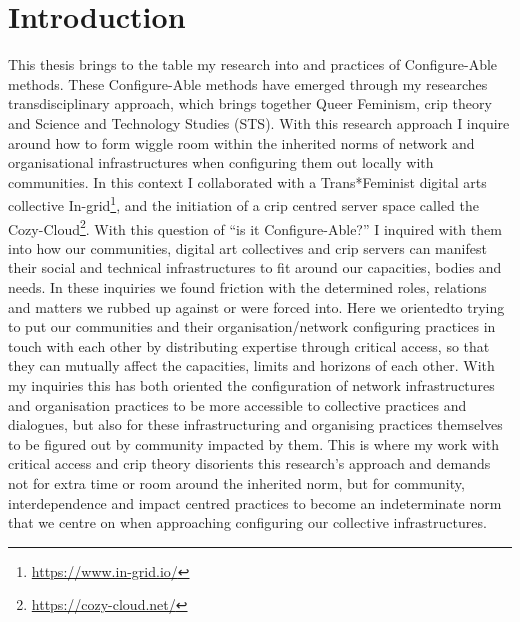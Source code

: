 \hypertarget{introduction}{%
\section{Introduction}\label{introduction}}

This thesis brings to the table my research into and practices of
Configure-Able methods. These Configure-Able methods have emerged
through my researches transdisciplinary approach, which brings together
Queer Feminism, crip theory and Science and Technology Studies (STS).
With this research approach I inquire around how to form wiggle room
within the inherited norms of network and organisational infrastructures
when configuring them out locally with communities. In this context I
collaborated with a Trans*Feminist digital arts collective
In-grid\footnote{\url{https://www.in-grid.io/}}, and the initiation of a
crip centred server space called the Cozy-Cloud\footnote{\url{https://cozy-cloud.net/}}.
With this question of ``is it Configure-Able?'' I inquired with them
into how our communities, digital art collectives and crip servers can
manifest their social and technical infrastructures to fit around our
capacities, bodies and needs. In these inquiries we found friction with
the determined roles, relations and matters we rubbed up against or were
forced into. Here we orientedto trying to put our communities and their
organisation/network configuring practices in touch with each other by
distributing expertise through critical access, so that they can
mutually affect the capacities, limits and horizons of each other. With
my inquiries this has both oriented the configuration of network
infrastructures and organisation practices to be more accessible to
collective practices and dialogues, but also for these infrastructuring
and organising practices themselves to be figured out by community
impacted by them. This is where my work with critical access and crip
theory disorients this research's approach and demands not for extra
time or room around the inherited norm, but for community,
interdependence and impact centred practices to become an indeterminate
norm that we centre on when approaching configuring our collective
infrastructures.

